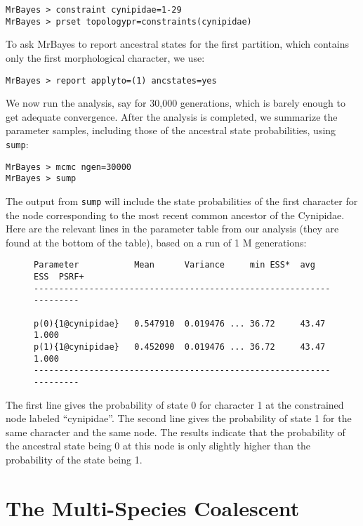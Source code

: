 \documentclass[12pt]{book}
\begin{document}
\begin{Verbatim}
MrBayes > constraint cynipidae=1-29
MrBayes > prset topologypr=constraints(cynipidae)
\end{Verbatim}

To ask MrBayes to report ancestral states for the first partition, which contains only the first
morphological character, we use:

\begin{Verbatim}
MrBayes > report applyto=(1) ancstates=yes
\end{Verbatim}

We now run the analysis, say for 30,000 generations, which is barely enough to get adequate
convergence. After the analysis is completed, we summarize the parameter samples, including those
of the ancestral state probabilities, using \texttt{sump}:

\begin{Verbatim}
MrBayes > mcmc ngen=30000
MrBayes > sump
\end{Verbatim}

The output from \texttt{sump} will include the state probabilities of the first character for the
node corresponding to the most recent common ancestor of the Cynipidae. Here are the relevant lines
in the parameter table from our analysis (they are found at the bottom of the table), based on a
run of 1 M generations:

\begin{figure}[h]
\centering
\begin{BVerbatim}
Parameter           Mean      Variance     min ESS*  avg ESS  PSRF+
--------------------------------------------------------------------

p(0){1@cynipidae}   0.547910  0.019476 ... 36.72     43.47    1.000
p(1){1@cynipidae}   0.452090  0.019476 ... 36.72     43.47    1.000
--------------------------------------------------------------------
\end{BVerbatim}
\end{figure}

The first line gives the probability of state 0 for character 1 at the constrained node labeled
``cynipidae''. The second line gives the probability of state 1 for the same character and the same
node. The results indicate that the probability of the ancestral state being 0 at this node is only
slightly higher than the probability of the state being 1.

\section{The Multi-Species Coalescent}\label{theMultiSpeciesCoalescent}
\end{document}
